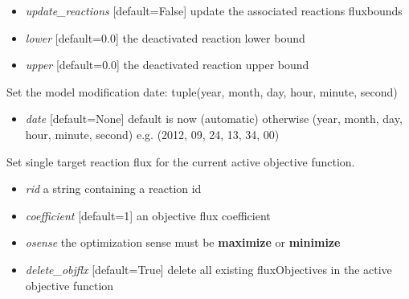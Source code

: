 \documentclass[a4paper,11pt,english]{sphinxmanual}
\begin{document}
\begin{fulllineitems}
\begin{fulllineitems}
\begin{itemize}
\item {} 
\emph{update\_reactions} {[}default=False{]} update the associated reactions fluxbounds

\item {} 
\emph{lower} {[}default=0.0{]} the deactivated reaction lower bound

\item {} 
\emph{upper} {[}default=0.0{]} the deactivated reaction upper bound

\end{itemize}

\end{fulllineitems}


\begin{fulllineitems}
\label{modules_doc:cbmpy.CBModel.Model.setModifiedDate}
Set the model modification date: tuple(year, month, day, hour, minute, second)
\begin{itemize}
\item {} 
\emph{date} {[}default=None{]} default is now (automatic) otherwise (year, month, day, hour, minute, second) e.g. (2012, 09, 24, 13, 34, 00)

\end{itemize}

\end{fulllineitems}


\begin{fulllineitems}
\label{modules_doc:cbmpy.CBModel.Model.setObjectiveFlux}
Set single target reaction flux for the current active objective function.
\begin{itemize}
\item {} 
\emph{rid} a string containing a reaction id

\item {} 
\emph{coefficient} {[}default=1{]} an objective flux coefficient

\item {} 
\emph{osense} the optimization sense must be \textbf{maximize} or \textbf{minimize}

\item {} 
\emph{delete\_objflx} {[}default=True{]} delete all existing fluxObjectives in the active objective function


\end{itemize}
\end{fulllineitems}
\end{fulllineitems}
\end{document}
